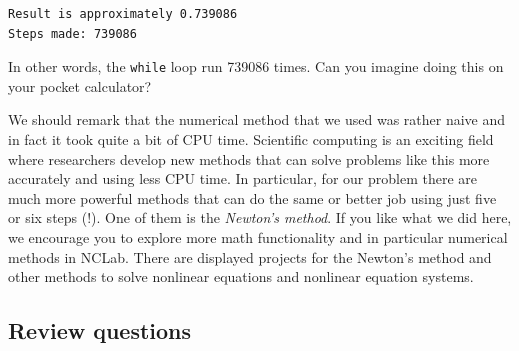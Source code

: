 \begin{verbatim}
Result is approximately 0.739086
Steps made: 739086
\end{verbatim}
In other words, the {\tt while} loop run 739086 times. Can you 
imagine doing this on your pocket calculator?

We should remark that the numerical method that we used was rather 
naive and in fact it took quite a bit of CPU time. Scientific computing
is an exciting field where researchers develop new methods that 
can solve problems like this more accurately and using less CPU time. 
In particular, for our problem there are much more powerful methods that can do the
same or better job using just five or six steps (!). One of them 
is the {\em Newton's method}. If you like what we did here, we encourage 
you to explore more math functionality and in particular numerical 
methods in NCLab. There are displayed projects for the Newton's method
and other methods to solve nonlinear equations and nonlinear equation systems.

\subsection{Review questions}


